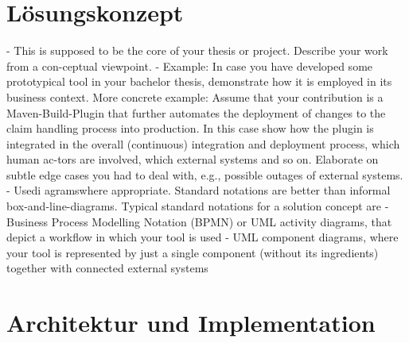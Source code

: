 \section{Lösungskonzept}

- This is supposed to be the core of your thesis or project. Describe your work from a con-ceptual viewpoint.
- Example: In case you have developed some prototypical tool in your bachelor thesis, demonstrate how it is employed in its business context. More concrete example: Assume that your contribution is a Maven-Build-Plugin that further automates the deployment of changes to the claim handling process into production. In this case show how the plugin is integrated in the overall (continuous) integration and deployment process, which human ac-tors are involved, which external systems and so on. Elaborate on subtle edge cases you had to deal with, e.g., possible outages of external systems.
- Usedi  agramswhere appropriate. Standard notations are better than informal box-and-line-diagrams. Typical standard notations for a solution concept are
  - Business Process Modelling Notation (BPMN) or UML activity diagrams, that depict a workflow in which your tool is used
  - UML component diagrams, where your tool is represented by just a single component (without its ingredients) together with connected external systems

\section{Architektur und Implementation}

